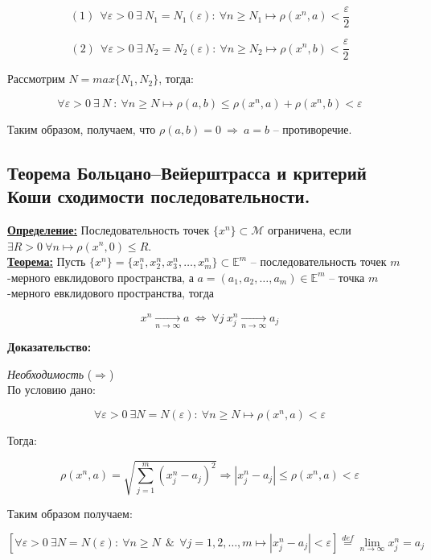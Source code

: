 \documentclass[a4paper,12pt]{article} %
\begin{document}
\[ (1) ~~ \forall \varepsilon > 0 ~ \exists ~ N_1 = N_1(\varepsilon) : ~ \forall n \geqslant N_1 \mapsto \rho(x^n, a) < \frac{\varepsilon}{2} \]

\[ (2) ~~ \forall \varepsilon > 0 ~ \exists ~ N_2 = N_2(\varepsilon) : ~ \forall n \geqslant N_2 \mapsto \rho(x^n, b) < \frac{\varepsilon}{2} \]

Рассмотрим $N = max \{N_1, N_2\}$, тогда:

\[ \forall \varepsilon > 0 ~ \exists ~ N ~ : ~ \forall n \geqslant N \mapsto \rho(a, b) \leqslant \rho(x^n, a) + \rho(x^n, b) < \varepsilon \]

Таким образом, получаем, что $\rho(a, b) = 0 ~ \Rightarrow ~ a = b$ -- противоречие.\\

\subsection{Теорема Больцано–Вейерштрасса и критерий Коши сходимости последовательности.}

\underline{\textbf{Определение:}} Последовательность точек $\{x^n \} \subset \mathscr{M}$ ограничена, если $\exists R > 0 ~ \forall n \mapsto \rho(x^n, 0) \leqslant R$.\\

\underline{\textbf{Теорема:}} Пусть $\{x^n \} = \{x_1^n, x_2^n, x_3^n, \dots, x_m^n\} \subset \mathbb{E}^m$ -- последовательность точек $m$-мерного евклидового пространства, а $a = (a_1, a_2, \dots, a_m) \in \mathbb{E}^m$ -- точка $m$-мерного евклидового пространства, тогда

\[ x^n \xrightarrow[n \to \infty]{} a ~ \Leftrightarrow ~ \forall j ~ x_j^n \xrightarrow[n \to \infty]{} a_j \]

\textbf{Доказательство:} 

\textit{Необходимость} ($\Rightarrow$)\\

По условию дано:

\[ \forall \varepsilon > 0 ~ \exists N = N(\varepsilon) : ~ \forall n \geqslant N \mapsto \rho(x^n, a) < \varepsilon \]

Тогда:

\[ \rho(x^n, a) = \sqrt{\sum\limits_{j = 1}^m (x_j^n - a_j)^2} \Rightarrow |x_j^n - a_j| \leqslant \rho(x^n, a) < \varepsilon \]

Таким образом получаем:

\[ [\forall \varepsilon > 0 ~ \exists N = N(\varepsilon) : ~ \forall n \geqslant N ~~ \& ~~ \forall j = 1, 2, \dots, m \mapsto |x_j^n - a_j| < \varepsilon] \stackrel{def}{=} \lim\limits_{n \to \infty} x_j^n = a_j \]
\end{document}
